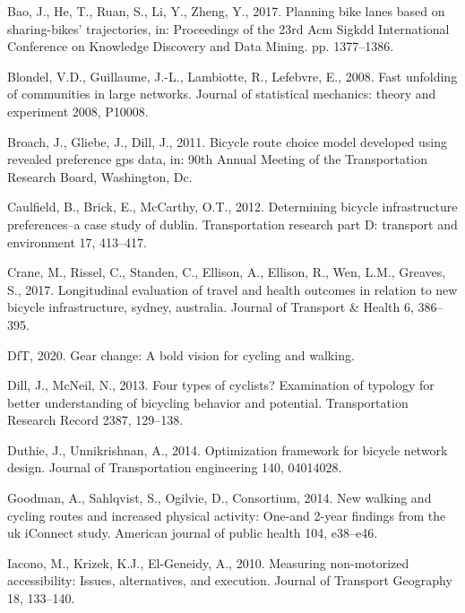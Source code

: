 \documentclass[
]{article}
\begin{document}
\leavevmode\hypertarget{ref-bao2017planning}{}%
Bao, J., He, T., Ruan, S., Li, Y., Zheng, Y., 2017. Planning bike lanes
based on sharing-bikes' trajectories, in: Proceedings of the 23rd Acm
Sigkdd International Conference on Knowledge Discovery and Data Mining.
pp. 1377--1386.

\leavevmode\hypertarget{ref-blondel2008fast}{}%
Blondel, V.D., Guillaume, J.-L., Lambiotte, R., Lefebvre, E., 2008. Fast
unfolding of communities in large networks. Journal of statistical
mechanics: theory and experiment 2008, P10008.

\leavevmode\hypertarget{ref-broach2011bicycle}{}%
Broach, J., Gliebe, J., Dill, J., 2011. Bicycle route choice model
developed using revealed preference gps data, in: 90th Annual Meeting of
the Transportation Research Board, Washington, Dc.

\leavevmode\hypertarget{ref-caulfield2012determining}{}%
Caulfield, B., Brick, E., McCarthy, O.T., 2012. Determining bicycle
infrastructure preferences--a case study of dublin. Transportation
research part D: transport and environment 17, 413--417.

\leavevmode\hypertarget{ref-crane2017longitudinal}{}%
Crane, M., Rissel, C., Standen, C., Ellison, A., Ellison, R., Wen, L.M.,
Greaves, S., 2017. Longitudinal evaluation of travel and health outcomes
in relation to new bicycle infrastructure, sydney, australia. Journal of
Transport \& Health 6, 386--395.

\leavevmode\hypertarget{ref-departmentgearchange2020}{}%
DfT, 2020. Gear change: A bold vision for cycling and walking.

\leavevmode\hypertarget{ref-dill2013four}{}%
Dill, J., McNeil, N., 2013. Four types of cyclists? Examination of
typology for better understanding of bicycling behavior and potential.
Transportation Research Record 2387, 129--138.

\leavevmode\hypertarget{ref-duthie2014optimization}{}%
Duthie, J., Unnikrishnan, A., 2014. Optimization framework for bicycle
network design. Journal of Transportation engineering 140, 04014028.

\leavevmode\hypertarget{ref-goodman2014new}{}%
Goodman, A., Sahlqvist, S., Ogilvie, D., Consortium, 2014. New walking
and cycling routes and increased physical activity: One-and 2-year
findings from the uk iConnect study. American journal of public health
104, e38--e46.

\leavevmode\hypertarget{ref-iacono2010measuring}{}%
Iacono, M., Krizek, K.J., El-Geneidy, A., 2010. Measuring non-motorized
accessibility: Issues, alternatives, and execution. Journal of Transport
Geography 18, 133--140.
\end{document}
